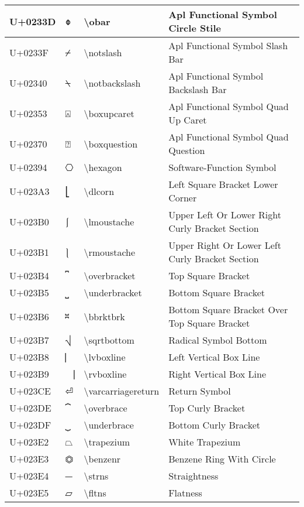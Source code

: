 \begin{table}[h]
\begin{tabulary}{\linewidth}{|L|L|L|L|}
\hline
U+0233D & ⌽ & {\textbackslash}obar & Apl Functional Symbol Circle Stile \\
\hline
U+0233F & ⌿ & {\textbackslash}notslash & Apl Functional Symbol Slash Bar \\
\hline
U+02340 & ⍀ & {\textbackslash}notbackslash & Apl Functional Symbol Backslash Bar \\
\hline
U+02353 & ⍓ & {\textbackslash}boxupcaret & Apl Functional Symbol Quad Up Caret \\
\hline
U+02370 & ⍰ & {\textbackslash}boxquestion & Apl Functional Symbol Quad Question \\
\hline
U+02394 & ⎔ & {\textbackslash}hexagon & Software-Function Symbol \\
\hline
U+023A3 & ⎣ & {\textbackslash}dlcorn & Left Square Bracket Lower Corner \\
\hline
U+023B0 & ⎰ & {\textbackslash}lmoustache & Upper Left Or Lower Right Curly Bracket Section \\
\hline
U+023B1 & ⎱ & {\textbackslash}rmoustache & Upper Right Or Lower Left Curly Bracket Section \\
\hline
U+023B4 & ⎴ & {\textbackslash}overbracket & Top Square Bracket \\
\hline
U+023B5 & ⎵ & {\textbackslash}underbracket & Bottom Square Bracket \\
\hline
U+023B6 & ⎶ & {\textbackslash}bbrktbrk & Bottom Square Bracket Over Top Square Bracket \\
\hline
U+023B7 & ⎷ & {\textbackslash}sqrtbottom & Radical Symbol Bottom \\
\hline
U+023B8 & ⎸ & {\textbackslash}lvboxline & Left Vertical Box Line \\
\hline
U+023B9 & ⎹ & {\textbackslash}rvboxline & Right Vertical Box Line \\
\hline
U+023CE & ⏎ & {\textbackslash}varcarriagereturn & Return Symbol \\
\hline
U+023DE & ⏞ & {\textbackslash}overbrace & Top Curly Bracket \\
\hline
U+023DF & ⏟ & {\textbackslash}underbrace & Bottom Curly Bracket \\
\hline
U+023E2 & ⏢ & {\textbackslash}trapezium & White Trapezium \\
\hline
U+023E3 & ⏣ & {\textbackslash}benzenr & Benzene Ring With Circle \\
\hline
U+023E4 & ⏤ & {\textbackslash}strns & Straightness \\
\hline
U+023E5 & ⏥ & {\textbackslash}fltns & Flatness \\

\end{tabulary}
\end{table}
